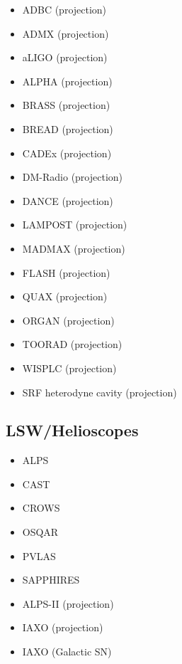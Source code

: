 \documentclass[11pt,twocolumn]{extarticle}
\begin{document}
\begin{mdframed}[everyline=true]
\begin{itemize}
        \item ADBC (projection)~\cite{Liu:2018icu} 
        \item ADMX (projection)~\cite{Stern:2016bbw}
              \item aLIGO (projection)~\cite{Nagano:2019rbw} 
           \item ALPHA (projection)~\cite{Lawson:2019brd} 
           \item BRASS (projection)~\cite{BRASS}
           \item BREAD (projection)~\cite{Liu:2021pei}
           \item CADEx (projection)~\cite{Aja:2022csb}
    \item DM-Radio (projection)~\cite{DMRadio,DMRadio:2022pkf}
     \item DANCE (projection)~\cite{Michimura:2019qxr} 
           \item LAMPOST (projection)~\cite{Baryakhtar:2018doz} 
      \item MADMAX (projection)~\cite{Beurthey:2020yuq} 
           \item FLASH (projection)~\cite{Alesini:2017ifp,FLASH} 
           \item QUAX (projection)~\cite{QUAX} 
                 \item ORGAN (projection)~\cite{McAllister:2017lkb} 
                       \item TOORAD (projection)~\cite{Schutte-Engel:2021bqm} 
                       \item WISPLC (projection)~\cite{Zhang:2021bpa} 
                       \item SRF heterodyne cavity (projection)~\cite{Berlin:2020vrk}

\end{itemize}
\vspace{-2.5em}
\subsection*{LSW/Helioscopes}\vspace{-0.5em}
\begin{itemize}\setlength\itemsep{-0.5em}
    \item ALPS~\cite{Ehret:2010mh}
    \item CAST~\cite{CAST:2007jps,CAST:2017uph}
    \item CROWS~\cite{Betz:2013dza}
    \item OSQAR~\cite{OSQAR:2015qdv}
    \item PVLAS~\cite{DellaValle:2015xxa}
    \item SAPPHIRES~\cite{SAPPHIRES:2021vkz}
    \item ALPS-II (projection)~\cite{Ortiz:2020tgs}
    \item IAXO (projection)~\cite{Shilon:2013xma}
    \item IAXO (Galactic SN)~\cite{Ge:2020zww}
\end{itemize}


\end{mdframed}
\end{document}
